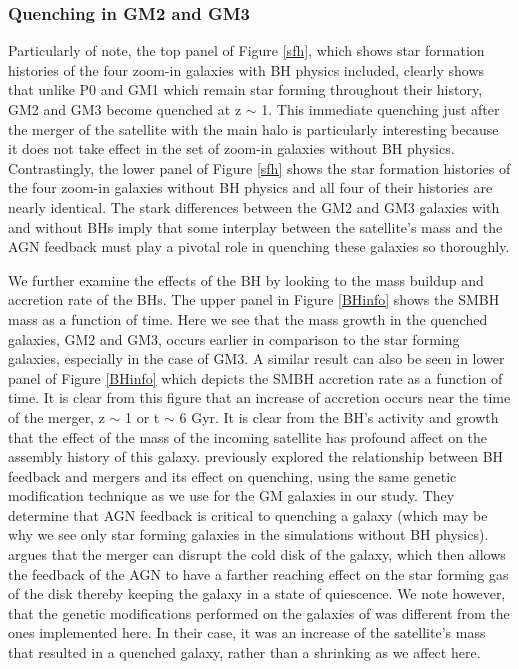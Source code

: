 \documentclass[]{emulateapj}
\begin{document}
\subsubsection{Quenching in GM2 and GM3}
Particularly of note, the top panel of Figure \ref{sfh}, which shows star formation histories of the four zoom-in galaxies with BH physics included, clearly shows that unlike P0 and GM1 which remain star forming throughout their history, GM2 and GM3 become quenched at z $\sim$ 1. This immediate quenching just after the merger of the satellite with the main halo is particularly interesting because it does not take effect in the set of zoom-in galaxies without BH physics. Contrastingly, the lower panel of Figure \ref{sfh} shows the star formation histories of the four zoom-in galaxies without BH physics and all four of their histories are nearly identical. The stark differences between the GM2 and GM3 galaxies with and without BHs imply that some interplay between the satellite's mass and the AGN feedback must play a pivotal role in quenching these galaxies so thoroughly. 

We further examine the effects of the BH by looking to the mass buildup and accretion rate of the BHs. The upper panel in Figure \ref{BHinfo} shows the SMBH mass as a function of time. Here we see that the mass growth in the quenched galaxies, GM2 and GM3, occurs earlier in comparison to the star forming galaxies, especially in the case of GM3. A similar result can also be seen in lower panel of Figure \ref{BHinfo} which depicts the SMBH accretion rate as a function of time. It is clear from this figure that an increase of accretion occurs near the time of the merger, z $\sim$ 1 or t $\sim$ 6 Gyr. It is clear from the BH's activity and growth that the effect of the mass of the incoming satellite has profound affect on the assembly history of this galaxy. \cite{Pontzen2016} previously explored the relationship between BH feedback and mergers and its effect on quenching, using the same genetic modification technique as we use for the GM galaxies in our study. They determine that AGN feedback is critical to quenching a galaxy (which may be why we see only star forming galaxies in the simulations without BH physics). \cite{Pontzen2016} argues that the merger can disrupt the cold disk of the galaxy, which then allows the feedback of the AGN to have a farther reaching effect on the star forming gas of the disk thereby keeping the galaxy in a state of quiescence. We note however, that the genetic modifications performed on the galaxies of \citep{Pontzen2016} was different from the ones implemented here. In their case, it was an increase of the satellite's mass that resulted in a quenched galaxy, rather than a shrinking as we affect here.
\end{document}
